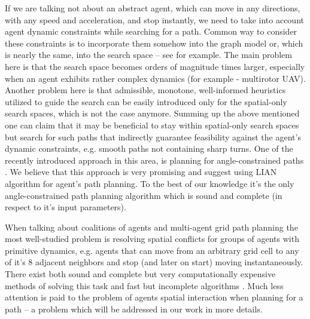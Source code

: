 \documentclass[runningheads,a4paper]{llncs}
\begin{document}
If we are talking not about an abstract agent, which can move in any directions, with any speed and acceleration, and stop instantly, we need to take into account agent dynamic constraints while searching for a path. Common way to consider these constraints is to incorporate them somehow into the graph model or, which is nearly the same, into the search space – see \cite{Kuwata2009} for example. The main problem here is that the search space becomes orders of magnitude times larger, especially when an agent exhibits rather complex dynamics (for example - multirotor UAV).  Another problem here is that admissible, monotone, well-informed heuristics utilized to guide the search can be easily introduced only for the spatial-only search spaces, which is not the case anymore. Summing up the above mentioned one can claim that it may be beneficial to stay within spatial-only search spaces but search for such paths that indirectly guarantee feasibility against the agent's dynamic constraints, e.g. smooth paths not containing sharp turns.  One of the recently introduced approach in this area, is planning for angle-constrained paths \cite{Kim2014}. We believe that this approach is very promising and suggest using LIAN algorithm \cite{Yakovlev2015} for agent's path planning. To the best of our knowledge it's the only angle-constrained path planning algorithm which is sound and complete (in respect to it's input parameters). 

When talking about coalitions of agents and multi-agent grid path planning the most well-studied problem is resolving spatial conflicts for groups of agents with primitive dynamics, e.g. agents that can move from an arbitrary grid cell to any of it's 8 adjacent neighbors and stop (and later on start) moving instantaneously. There exist both sound and complete but very computationally expensive methods of solving this task \cite{Standley2010} and fast but incomplete algorithms \cite{Wang2008,Silver2006}. Much less attention is paid to the problem of agents spatial interaction when planning for a path – a problem which will be addressed in our work in more details.
\end{document}
